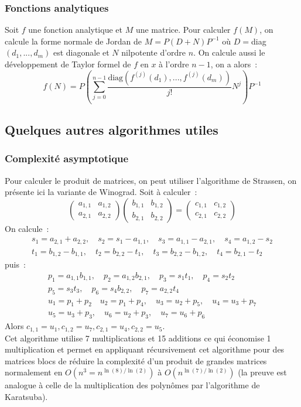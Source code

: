 \documentclass[a4paper,11pt]{article}
\begin{document}
\subsubsection{Fonctions analytiques}
Soit $f$ une fonction analytique et $M$ une matrice. Pour calculer
$f(M)$, on calcule la forme normale de Jordan de 
$M=P(D+N)P^{-1}$ o\`u $D=$diag$(d_1,...,d_m)$ est diagonale et $N$ nilpotente
d'ordre $n$. On calcule
aussi le d\'eveloppement de Taylor formel de $f$ en $x$ \`a l'ordre
$n-1$, on a alors~:
\[ f(N)=P \left(\sum_{j=0}^{n-1} \frac{\mbox{diag}(f^{(j)}(d_1),...,
f^{(j)}(d_m))}{j!} N^j \right) P^{-1}\]

\subsection{Quelques autres algorithmes utiles}
\subsubsection{Complexit\'e asymptotique}
Pour calculer le produit de matrices, on peut utiliser
l'algorithme de Strassen, on pr\'esente ici la variante
de Winograd. Soit \`a calculer~:
\[ \left(\begin{array}{cc} a_{1,1} & a_{1,2} \\
a_{2,1} & a_{2,2} \end{array}\right) 
\left(\begin{array}{cc} b_{1,1} & b_{1,2} \\
b_{2,1} & b_{2,2} \end{array}\right)
=\left(\begin{array}{cc} c_{1,1} & c_{1,2} \\
c_{2,1} & c_{2,2} \end{array}\right)
\]
On calcule~:
\begin{eqnarray*} 
s_1=a_{2,1}+a_{2,2}, \quad s_2=s_1-a_{1,1}, \quad 
s_3=a_{1,1}- a_{2,1}, \quad s_4=a_{1,2}-s_2
\\
t_1=b_{1,2}-b_{1,1}, \quad t_2=b_{2,2}-t_1,
\quad t_3=b_{2,2}-b_{1,2}, \quad t_4=b_{2,1}-t_2
\end{eqnarray*}
puis~:
\begin{eqnarray*}
 p_1=a_{1,1} b_{1,1}, \quad
p_2=a_{1,2}b_{2,1}, \quad
p_3=s_1 t_1, \quad p_4=s_2 t_2 \\
p_5=s_3 t_3, \quad p_6=s_4 b_{2,2},
\quad p_7=a_{2,2} t_4 \\
u_1= p_1+p_2 \quad u_2=p_1+p_4,
\quad u_3=u_2+p_5, \quad u_4=u_3+p_7\\
u_5=u_3+p_3, \quad
u_6=u_2+p_3, \quad u_7=u_6+p_6
\end{eqnarray*}
Alors $c_{1,1}=u_1, c_{1,2}=u_7, c_{2,1}=u_4, c_{2,2}=u_5$.\\
Cet algorithme utilise 7 multiplications et 15 additions
ce qui \'economise 1 multiplication et permet en appliquant
r\'ecursivement cet algorithme pour des matrices blocs
de r\'eduire la complexit\'e d'un produit de grandes matrices
normalement en $O(n^3=n^{\ln(8)/\ln(2)})$ \`a $O(n^{\ln(7)/\ln(2)})$ (la preuve
est analogue \`a celle de la multiplication des polyn\^omes
par l'algorithme de Karatsuba).
\end{document}
